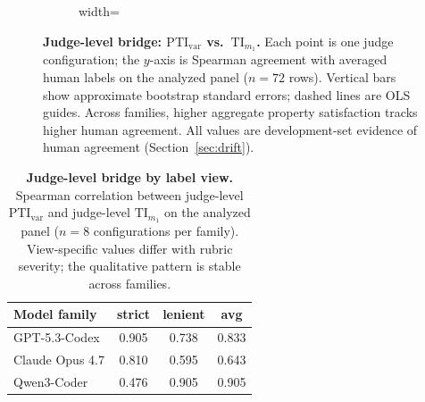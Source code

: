 \documentclass{article}
\newcommand{\TI}{\mathrm{TI}}                    %
\newcommand{\PTI}{\mathrm{PTI}}                  %
\newcommand{\TIm}[1]{\TI_{m_{#1}}}
\newcommand{\PTIvar}{\PTI_{\mathrm{var}}}        %
\begin{document}
\begin{figure}[t]
\begin{subfigure}[t]{0.30\textwidth}
\begin{adjustbox}{width=\linewidth}
    \end{adjustbox}
  \end{subfigure}
  \caption{\textbf{Judge-level bridge: $\PTIvar$ vs.\ $\TIm{1}$.}
  Each point is one judge configuration; the $y$-axis is Spearman agreement with averaged human labels on the analyzed panel ($n{=}72$ rows).
  Vertical bars show approximate bootstrap standard errors; dashed lines are OLS guides.
  Across families, higher aggregate property satisfaction tracks higher human agreement.
  All values are development-set evidence of human agreement (Section~\ref{sec:drift}).}
  \label{fig:bridge_cross_model}
  \vspace{-2mm}
\end{figure}

\begin{table}[t]
  \centering
  \small
  \begin{tabular}{lccc}
    \toprule
    \textbf{Model family} & \textbf{strict} & \textbf{lenient} & \textbf{avg} \\
    \midrule
    GPT-5.3-Codex   & 0.905 & 0.738 & 0.833 \\
    Claude Opus 4.7 & 0.810 & 0.595 & 0.643 \\
    Qwen3-Coder     & 0.476 & 0.905 & 0.905 \\
    \bottomrule
  \end{tabular}
  \caption{\textbf{Judge-level bridge by label view.} Spearman correlation between judge-level $\PTIvar$ and judge-level $\TIm{1}$ on the analyzed panel ($n{=}8$ configurations per family). View-specific values differ with rubric severity; the qualitative pattern is stable across families.}
  \label{tab:bridge_cross_model}
\end{table}
\end{document}
